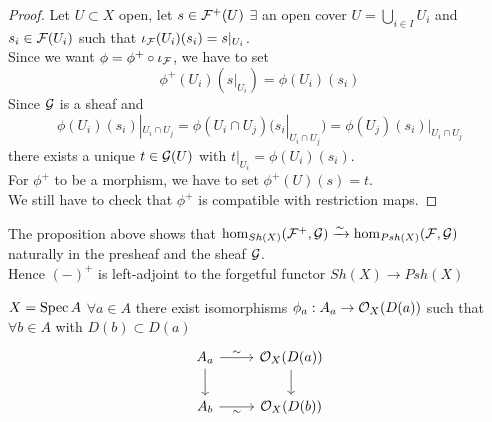 \documentclass[../main.tex]{subfiles}
\begin{document}
\begin{proof}
Let $U \subset X$ open, let $s\in \mathcal{F}^{+}( U) $ $\exists $ an open cover $U = \bigcup_{i \in I} U_i$ and $s_i \in \mathcal{F}( U_i) $ such that $\iota_{\mathcal{F}}( U_i) ( s_i) = s|_{U_i} $.\\
Since we want $\phi = \phi^{+}\circ \iota_{\mathcal{F}}$, we have to set 
\[ 
\phi^{+}( U_i ) ( s|_{U_i} ) = \phi( U_i) ( s_i) 
\]
Since $\mathcal{G}$ is a sheaf and
\[ 
\phi( U_i ) ( s_i) |_{U_i \cap U_j}  = \phi( U_i \cap U_j) ( s_i |_{U_i \cap U_j} ) = \phi( U_j) ( s_i) |_{U_i \cap U_j} 
\]
there exists a unique $t\in \mathcal{G}( U) $ with $t|_{U_i} = \phi( U_i) ( s_i) $.\\
For $\phi^{+}$ to be a morphism, we have to set $\phi^{+}( U) ( s) = t$.\\
We still have to check that $\phi^{+}$ is compatible with restriction maps.
\end{proof}
\begin{rmq}
	The proposition above shows that $\hom_{Sh( X) } ( \mathcal{F}^{+},\mathcal{G}) \xrightarrow{\sim} \hom_{Psh( X) } ( \mathcal{F},\mathcal{G})  $ naturally in the presheaf and the sheaf $\mathcal{G}$.\\
	Hence $( -) ^{+}$ is left-adjoint to the forgetful functor $Sh(X)\to Psh( X)  $ 
\end{rmq}
\begin{propo}
$X= \operatorname{Spec} A$ $\forall a \in A$ there exist isomorphisms $\phi_a: A_a \to \mathcal{O}_X( D( a) ) $ such that $\forall b \in A$ with $D( b) \subset D( a) $ 
\[\begin{tikzcd}
	{A_a} & {\O_X(D(a))} \\
	{A_b} & {\O_X(D(b))}
	\arrow[from=1-1, to=2-1]
	\arrow["\sim", from=1-1, to=1-2]
	\arrow["\sim"', from=2-1, to=2-2]
	\arrow[from=1-2, to=2-2]
\end{tikzcd}\]
\end{propo}
\end{document}
